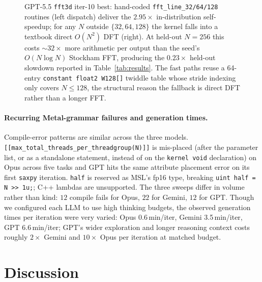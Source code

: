 \documentclass{article}
\theoremstyle{plain}
\theoremstyle{definition}
\theoremstyle{remark}
\begin{document}
\begin{figure}[!t]
\caption{GPT-5.5 \texttt{fft3d} iter-10 best: hand-coded
\texttt{fft\_line\_32/64/128} routines (left dispatch) deliver the
$2.95\times$ in-distribution self-speedup; for any $N$ outside
$\{32, 64, 128\}$ the kernel falls into a textbook direct
$O(N^{2})$ DFT (right). At held-out $N{=}256$ this costs
${\sim}32{\times}$ more arithmetic per output than the seed's
$O(N\log N)$ Stockham FFT, producing the $0.23\times$ held-out
slowdown reported in Table~\ref{tab:results}. The fast paths reuse
a 64-entry \texttt{constant float2 W128[]} twiddle table whose stride
indexing only covers $N{\leq}128$, the structural reason the
fallback is direct DFT rather than a longer FFT.}
\label{fig:gpt5-fft-fallback}
\end{figure}

\paragraph{Recurring Metal-grammar failures and generation times.}
Compile-error patterns are similar across the three models.
\texttt{[[max\_total\_threads\_per\_threadgroup(N)]]} is mis-placed
(after the parameter list, or as a standalone statement, instead of on
the \texttt{kernel void} declaration) on Opus across five tasks and GPT hits the same
attribute placement error on its first \texttt{saxpy} iteration.
\texttt{half} is reserved as MSL's fp16 type, breaking
\texttt{uint half = N >> 1u;}; C++ lambdas are unsupported. The
three sweeps differ in volume rather than kind: $12$ compile
fails for Opus, $22$ for Gemini, $12$ for GPT. Though we configured each LLM to use high thinking budgets, the observed generation times per iteration were very varied: Opus 0.6\,min/iter, Gemini 3.5\,min/iter, GPT
6.6\,min/iter; GPT's wider
exploration and longer reasoning context costs roughly $2\times$
Gemini and $10\times$ Opus per iteration at matched budget.






\section{Discussion}
\end{document}
